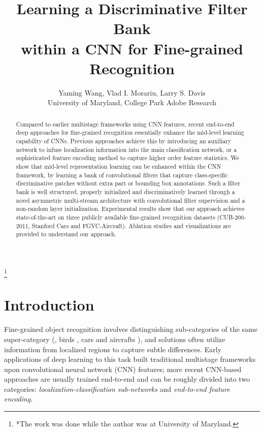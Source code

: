 \documentclass[10pt,twocolumn,letterpaper]{article}
\begin{document}
\title{Learning a Discriminative Filter Bank\\within a CNN for Fine-grained Recognition}

\author{Yaming Wang, \; Vlad I. Morariu, \; Larry S. Davis\\
University of Maryland, College Park \quad Adobe Research\\
\quad\quad{} \quad\quad{}
}

\maketitle
\thispagestyle{empty}
\let\thefootnote\relax\footnote{*The work was done while the author was at University of Maryland.}
\begin{abstract}
Compared to earlier multistage frameworks using CNN features, recent end-to-end deep approaches for
fine-grained recognition essentially enhance the mid-level learning capability of CNNs. Previous approaches achieve
this by introducing an auxiliary network to infuse localization information into the main classification network, or
a sophisticated feature encoding method to capture higher order feature statistics. We show that mid-level
representation learning can be enhanced within the CNN framework, by learning a bank of convolutional
filters that capture class-specific discriminative patches without extra part or bounding box annotations. Such a filter
bank is well structured, properly initialized and discriminatively learned through a novel asymmetric multi-stream
architecture with convolutional filter supervision and a non-random layer initialization. 
Experimental results show that our approach achieves state-of-the-art on three publicly available fine-grained recognition datasets
(CUB-200-2011, Stanford Cars and FGVC-Aircraft). Ablation studies and visualizations are provided
to understand our approach.
\end{abstract}

\section{Introduction} \label{sec1}
Fine-grained object recognition involves distinguishing sub-categories of the same super-category
(\eg, birds \cite{cub2011}, cars \cite{car196} and aircrafts \cite{fgvc_air}),
and solutions often utilize information from localized regions to capture subtle differences. Early
applications of deep learning to this task built traditional multistage frameworks upon convolutional neural network
(CNN) features; more recent CNN-based approaches are usually trained end-to-end and can be roughly divided into two
categories: \textit{localization-classification sub-networks} and
\textit{end-to-end feature encoding}.
\end{document}
